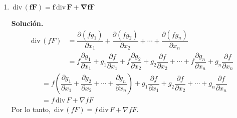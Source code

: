 \documentclass[fleqn, 12pt]{article}
\newcommand{\derivadaparcial}[2]{\dfrac{\partial {#1}}{\partial {#2}}}
\newcommand{\rot}{\mathrm{\, rot \,}}
\newcommand{\dive}{\mathrm{\, div \,}}
\begin{document}
\begin{enumerate}
\begin{align*}
\begin{matrix}
                g_1 & g_3
            \end{matrix}
            \right\rvert \widehat{j} +
            \left\rvert 
            \begin{matrix}
                \derivadaparcial{}{x} & \derivadaparcial{}{y} \vspace{1mm} \\
                g_1 & g_2
            \end{matrix}
            \right\rvert \widehat{k} \\
            &= \left\lvert 
            \begin{matrix}
                \widehat{i} & \widehat{j} & \widehat{k} \vspace{1mm} \\
                \derivadaparcial{}{x} & \derivadaparcial{}{y} & \derivadaparcial{}{z} \vspace{1mm} \\
                f_1 & f_2 & f_3
            \end{matrix} \right\rvert + 
            \left\lvert 
            \begin{matrix}
                \widehat{i} & \widehat{j} & \widehat{k} \vspace{1mm} \\
                \derivadaparcial{}{x} & \derivadaparcial{}{y} & \derivadaparcial{}{z} \vspace{1mm} \\
                g_1 & g_2 & g_3
            \end{matrix}
            \right\rvert \\
            &= \rot F + \rot G
        \end{align*}
        Por lo tanto, $ \rot (F + G) = \rot F + \rot G $. \\

        \item $ \mathbf{\dive (fF) = f \dive F + \nabla f F} $
        
        \textbf{Solución.}
        \begin{align*}
            \dive (fF) &= \derivadaparcial{(f g_1)}{x_1} + \derivadaparcial{(f g_2)}{x_2} + \cdots + \derivadaparcial{(f g_n)}{x_n} \\
            &= f \derivadaparcial{g_1}{x_1} + g_1 \derivadaparcial{f}{x_1} + f \derivadaparcial{g_2}{x_2} + g_2 \derivadaparcial{f}{x_2} + \cdots + f \derivadaparcial{g_n}{x_n} + g_n \derivadaparcial{f}{x_n}
        \end{align*}
        \begin{align*}
            &= f \left( \derivadaparcial{g_1}{x_1} + \derivadaparcial{g_2}{x_2} + \cdots + \derivadaparcial{g_n}{x_n} \right) + g_1 \derivadaparcial{f}{x_1} + g_2 \derivadaparcial{f}{x_2} + \cdots + g_n \derivadaparcial{f}{x_n} \\
            &= f \dive F + \nabla f F
        \end{align*}
        Por lo tanto, $ \dive (fF) = f \dive F + \nabla f F $. \\


\end{enumerate}
\end{document}
